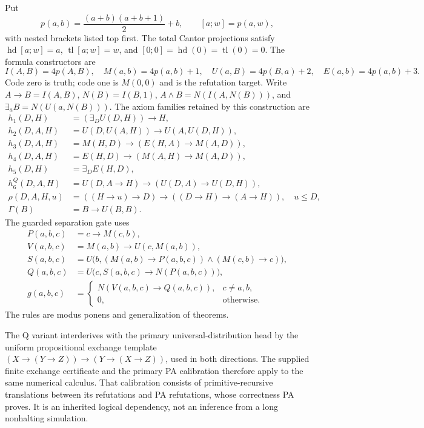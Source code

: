 Put
\[
 p(a,b)=\frac{(a+b)(a+b+1)}2+b,\qquad [a;w]=p(a,w),
\]
with nested brackets listed top first. The total Cantor projections satisfy
$\operatorname{hd}[a;w]=a$, $\operatorname{tl}[a;w]=w$, and
$[0;0]=\operatorname{hd}(0)=\operatorname{tl}(0)=0$.
The formula constructors are
\[
 I(A,B)=4p(A,B),\quad M(a,b)=4p(a,b)+1,\quad
 U(a,B)=4p(B,a)+2,\quad E(a,b)=4p(a,b)+3.
\]
Code zero is truth; code one is $M(0,0)$ and is the refutation target.
Write $A\to B=I(A,B)$, $N(B)=I(B,1)$,
$A\wedge B=N(I(A,N(B)))$, and $\exists_a B=N(U(a,N(B)))$.
The axiom families retained by this construction are
\begin{align*}
 h_1(D,H)&=(\exists_D U(D,H))\to H,\\
 h_2(D,A,H)&=U(D,U(A,H))\to U(A,U(D,H)),\\
 h_3(D,A,H)&=M(H,D)\to(E(H,A)\to M(A,D)),\\
 h_4(D,A,H)&=E(H,D)\to(M(A,H)\to M(A,D)),\\
 h_5(D,H)&=\exists_D E(H,D),\\
 h_6^{Q}(D,A,H)&=U(D,A\to H)\to(U(D,A)\to U(D,H)),\\
 \rho(D,A,H,u)&=((H\to u)\to D)\to((D\to H)\to(A\to H)),
       \quad u\le D,\\
 \Gamma(B)&=B\to U(B,B).
\end{align*}
The guarded separation gate uses
\begin{align*}
 P(a,b,c)&=c\to M(c,b),\\
 V(a,b,c)&=M(a,b)\to U(c,M(a,b)),\\
 S(a,b,c)&=U\bigl(b,(M(a,b)\to P(a,b,c))\wedge(M(c,b)\to c)\bigr),\\
 Q(a,b,c)&=U\bigl(c,S(a,b,c)\to N(P(a,b,c))\bigr),\\
 g(a,b,c)&=\begin{cases}N(V(a,b,c)\to Q(a,b,c)),&c\ne a,b,\\0,&\text{otherwise.}\end{cases}
\end{align*}
The rules are modus ponens and generalization of theorems.

The Q variant interderives with the primary universal-distribution head by
the uniform propositional exchange template
$(X\to(Y\to Z))\to(Y\to(X\to Z))$, used in both directions.
The supplied finite exchange certificate and the primary PA calibration
therefore apply to the same numerical calculus. That calibration consists
of primitive-recursive translations between its refutations and PA
refutations, whose correctness PA proves. It is an inherited logical
dependency, not an inference from a long nonhalting simulation.

